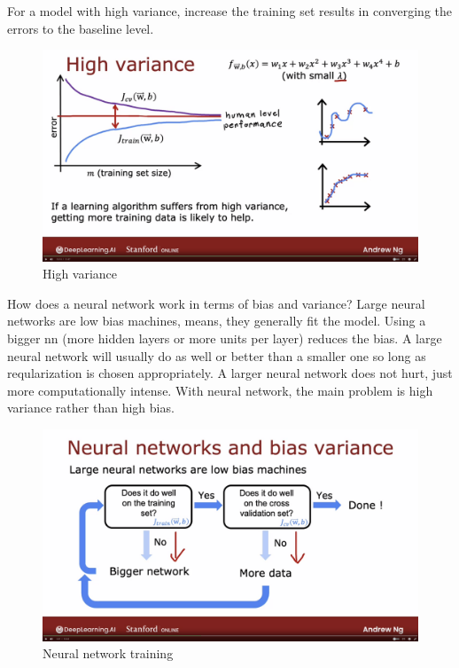 \documentclass[12pt]{report}
\begin{document}
For a model with high variance, increase the training set results in converging the errors to the baseline level.

\begin{figure}[H]
  \centering
  \includegraphics[trim =0.0cm 0.0cm 0.0cm 0.0cm, clip, scale=0.12]{pics/highVariance.png}
  \caption{High variance}
\end{figure}

How does a neural network work in terms of bias and variance? Large neural networks are low bias machines, means, they generally fit the model. Using a bigger nn (more hidden layers or more units per layer) reduces the bias. A large neural network will usually do as well or better than a smaller one so long as reqularization is chosen appropriately. A larger neural network does not hurt, just more computationally intense. With neural network, the main problem is high variance rather than high bias.


\begin{figure}[H]
  \centering
  \includegraphics[trim =0.0cm 0.0cm 0.0cm 0.0cm, clip, scale=0.12]{pics/nn.png}
  \caption{Neural network training}
\end{figure}
\end{document}
